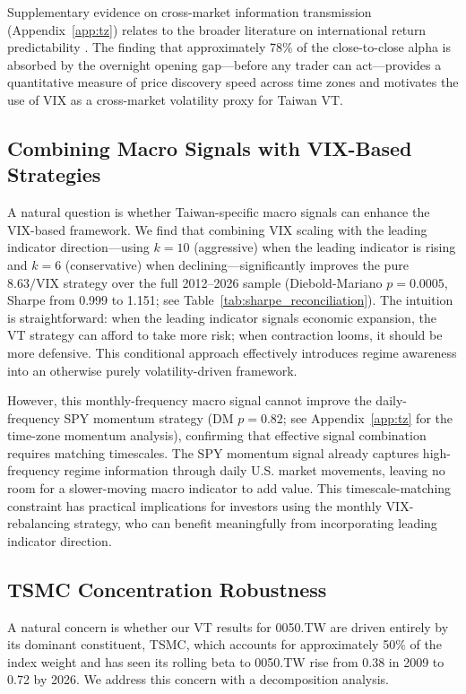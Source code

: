 Supplementary evidence on cross-market information transmission (Appendix~\ref{app:tz}) relates to the broader literature on international return predictability \citep{eun1989,rapach2013}. The finding that approximately 78\% of the close-to-close alpha is absorbed by the overnight opening gap---before any trader can act---provides a quantitative measure of price discovery speed across time zones and motivates the use of VIX as a cross-market volatility proxy for Taiwan VT.

\subsection{Combining Macro Signals with VIX-Based Strategies}

A natural question is whether Taiwan-specific macro signals can enhance the VIX-based framework. We find that combining VIX scaling with the leading indicator direction---using $k = 10$ (aggressive) when the leading indicator is rising and $k = 6$ (conservative) when declining---significantly improves the pure $8.63/\text{VIX}$ strategy over the full 2012--2026 sample (Diebold-Mariano $p = 0.0005$, Sharpe from 0.999 to 1.151; see Table~\ref{tab:sharpe_reconciliation}). The intuition is straightforward: when the leading indicator signals economic expansion, the VT strategy can afford to take more risk; when contraction looms, it should be more defensive. This conditional approach effectively introduces regime awareness into an otherwise purely volatility-driven framework.

However, this monthly-frequency macro signal cannot improve the daily-frequency SPY momentum strategy (DM $p = 0.82$; see Appendix~\ref{app:tz} for the time-zone momentum analysis), confirming that effective signal combination requires matching timescales. The SPY momentum signal already captures high-frequency regime information through daily U.S. market movements, leaving no room for a slower-moving macro indicator to add value. This timescale-matching constraint has practical implications for investors using the monthly VIX-rebalancing strategy, who can benefit meaningfully from incorporating leading indicator direction.


\subsection{TSMC Concentration Robustness}
\label{sec:tsmc}

A natural concern is whether our VT results for 0050.TW are driven entirely by its dominant constituent, TSMC, which accounts for approximately 50\% of the index weight and has seen its rolling beta to 0050.TW rise from 0.38 in 2009 to 0.72 by 2026. We address this concern with a decomposition analysis.

